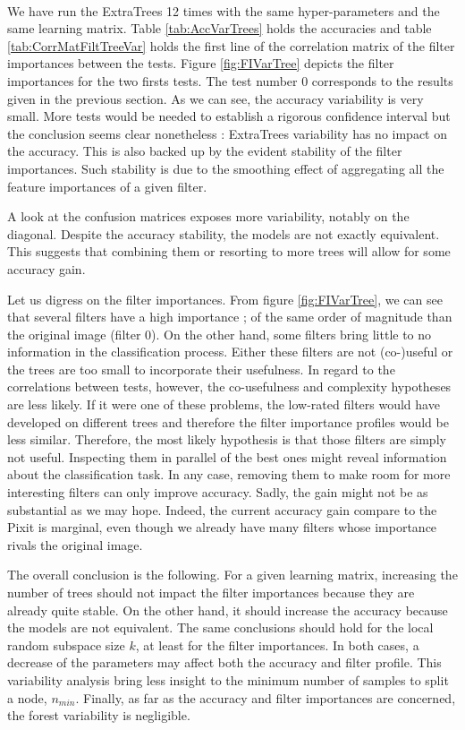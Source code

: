 \documentclass[a4paper]{report}
\begin{document}
		
		\paragraph{}
		We have run the ExtraTrees 12 times with the same hyper-parameters and the same learning matrix. Table \ref{tab:AccVarTrees} holds the accuracies and table \ref{tab:CorrMatFiltTreeVar} holds the first line of the correlation matrix of the filter importances between the tests. Figure \ref{fig:FIVarTree} depicts the filter importances for the two firsts tests. The test number 0 corresponds to the results given in the previous section. As we can see, the accuracy variability is very small. More tests would be needed to establish a rigorous confidence interval but the conclusion seems clear nonetheless : ExtraTrees variability has no impact on the accuracy. This is also backed up by the evident stability of the filter importances. Such stability is due to the smoothing effect of aggregating all the feature importances of a given filter.
		\par
		A look at the confusion matrices exposes more variability, notably on the diagonal. Despite the accuracy stability, the models are not exactly equivalent. This suggests that combining them or resorting to more trees will allow for some accuracy gain.
		\par
		Let us digress on the filter importances. From figure \ref{fig:FIVarTree}, we can see that several filters have a high importance ; of the same order of magnitude than the original image (filter 0). On the other hand, some filters bring little to no information in the classification process. Either these filters are not (co-)useful or the trees are too small to incorporate their usefulness. In regard to the correlations between tests, however, the co-usefulness and complexity hypotheses are less likely. If it were one of these problems, the low-rated filters would have developed on different trees and therefore the filter importance profiles would be less similar. Therefore, the most likely hypothesis is that those filters are simply not useful. Inspecting them in parallel of the best ones might reveal information about the classification task. In any case, removing them to make room for more interesting filters can only improve accuracy. Sadly, the gain might not be as substantial as we may hope. Indeed, the current accuracy gain compare to the Pixit is marginal, even though we already have many filters whose importance rivals the original image. 
		\par
		The overall conclusion is the following. For a given learning matrix, increasing the number of trees should not impact the filter importances because they are already quite stable. On the other hand, it should increase the accuracy because the models are not equivalent. The same conclusions should hold for the local random subspace size $k$, at least for the filter importances. In both cases, a decrease of the parameters may affect both the accuracy and filter profile. This variability analysis bring less insight to the minimum number of samples to split a node, $n_{min}$. Finally, as far as the accuracy and filter importances are concerned, the forest variability is negligible.
\end{document}
